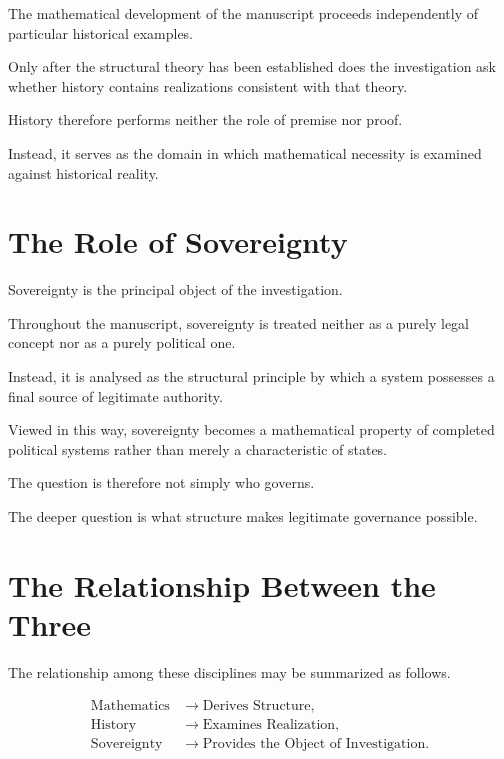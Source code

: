 \documentclass[11pt,openany]{book}
\theoremstyle{plain}
\theoremstyle{definition}
\begin{document}
The mathematical development of the manuscript proceeds independently of particular historical examples.

Only after the structural theory has been established does the investigation ask whether history contains realizations consistent with that theory.

History therefore performs neither the role of premise nor proof.

Instead, it serves as the domain in which mathematical necessity is examined against historical reality.


\section*{The Role of Sovereignty}

Sovereignty is the principal object of the investigation.

Throughout the manuscript, sovereignty is treated neither as a purely legal concept nor as a purely political one.

Instead, it is analysed as the structural principle by which a system possesses a final source of legitimate authority.

Viewed in this way, sovereignty becomes a mathematical property of completed political systems rather than merely a characteristic of states.

The question is therefore not simply who governs.

The deeper question is what structure makes legitimate governance possible.


\section*{The Relationship Between the Three}

The relationship among these disciplines may be summarized as follows.

\[
\boxed{
\begin{aligned}
\text{Mathematics} &\longrightarrow \text{Derives Structure},\\[0.3em]
\text{History} &\longrightarrow \text{Examines Realization},\\[0.3em]
\text{Sovereignty} &\longrightarrow \text{Provides the Object of Investigation}.
\end{aligned}
}
\]
\end{document}
